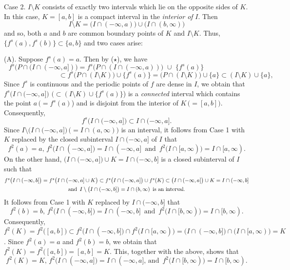 \documentclass[12pt]{article}
\begin{document}
Case 2. $I \setminus K$ consists of exactly two intervals which lie on the opposite sides of $K$.  In this case, $K = [a, b]$ is a compact interval in the {\it interior of} $I$.  Then 
$$
I \setminus K = \big(I \cap (-\infty, a)\big) \cup \big(I \cap (b, \infty)\big)
$$ 
and so, both $a$ and $b$ are common boundary points of $K$ and $I \setminus K$.  Thus, $\big\{ f^s(a), f^s(b) \big\} \subset \{ a, b \}$ and two cases arise:

(A).  Suppose $f^s(a) = a$.  Then by ($\star$), we have
$$
f^s\big(P \cap (I \cap (-\infty, a])\big) = f^s\big(P \cap (I \cap (-\infty, a))\big) \,\, \cup \,\, \{ f^s(a) \} \qquad\qquad\qquad
$$ 
$$
\qquad\qquad\qquad\qquad \subset f^s\big(P \cap (I \setminus K)\big) \cup \big\{ f^s(a) \big\} = \big(P \cap (I \setminus K)\big) \cup \big\{ a \big\} \subset (I \setminus K) \cup \big\{ a \big\},
$$
Since $f^s$ is continuous and the periodic points of $f$ are dense in $I$, we obtain that $f^s\big(I \cap (-\infty, a]\big)$ $\big(\subset (I \setminus K) \cup \big\{ f^s(a) \big\}$\big) is a {\it connected} interval which contains the point $a \, \big(= f^s(a)$\big) and is disjoint from the interior of $K \, \big(= [a, b]\big)$.  Consequently, 
$$
f^s\big(I \cap (-\infty, a]\big) \subset I \cap (-\infty, a].
$$  
Since $I \setminus \big(I \cap (-\infty, a]\big) \, \big(= I \cap (a, \infty)\big)$ is an interval, it follows from Case 1 with $K$ replaced by the closed subinterval $I \cap (-\infty, a]$ of $I$ that 
$$
f^2(a) = a, \, f^2\big(I \cap (-\infty, a]\big) = I \cap (-\infty, a] \,\,\, \text{and} \,\,\, f^2\big(I \cap [a, \infty)\big) = I \cap [a, \infty).
$$  
\indent On the other hand, $\big(I \cap (-\infty, a]\big) \cup K = I \cap (-\infty, b]$ is a closed subinterval of $I$ such that 
\begin{multline*}
$$
f^s\big(I \cap (-\infty, b]\big) = f^s\big(I \cap (-\infty, a] \cup K\big) \subset f^s\big(I \cap (-\infty, a]\big) \cup f^s(K) \subset \big(I \cap (-\infty, a]\big) \cup K = I \cap (-\infty, b] \\ \text{and} \,\,\, I \setminus \big(I \cap (-\infty, b]\big) = I \cap (b, \infty) \,\,\, \text{is an interval}.
$$
\end{multline*}
It follows from Case 1 with $K$ replaced by $I \cap (-\infty, b]$ that 
$$
f^2(b) = b, \, f^2\big(I \cap (-\infty, b]\big) = I \cap (-\infty, b] \,\,\, \text{and} \,\,\, f^2\big(I \cap [b, \infty)\big) = I \cap [b, \infty).
$$  
Consequently, $f^2(K) = f^2\big([a, b]\big) \subset f^2\big(I \cap (-\infty, b]\big) \cap f^2\big(I \cap [a, \infty)\big) = \big(I \cap (-\infty, b]\big) \cap \big(I \cap [a, \infty)\big) = K$.  Since $f^2(a) = a$ and $f^2(b) = b$, we obtain that $f^2(K) = f^2\big([a, b]\big) = [a, b] = K$.  This, together with the above, shows that 
$$
f^2(K) = K, \, f^2\big(I \cap (-\infty, a]\big) = I \cap (-\infty, a], \, \text{and} \,\,\, f^2\big(I \cap [b, \infty)\big) = I \cap [b, \infty).
$$  
\end{document}

